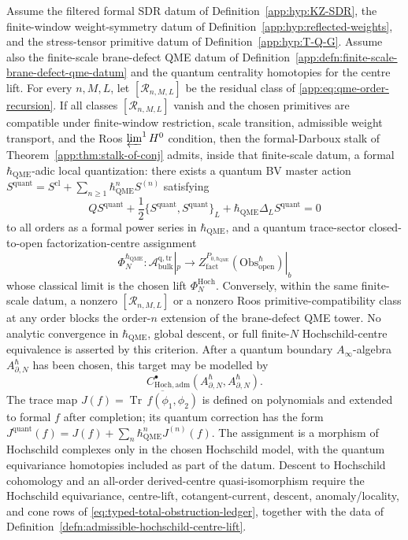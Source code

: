 \begin{thm}\label{app:thm:relative-qme}
Assume the filtered formal SDR datum of
Definition~\ref{app:hyp:KZ-SDR}, the finite-window weight-symmetry datum
of Definition~\ref{app:hyp:reflected-weights}, and the stress-tensor
primitive datum of Definition~\ref{app:hyp:T-Q-G}.  Assume also the
finite-scale brane-defect QME datum of
Definition~\ref{app:defn:finite-scale-brane-defect-qme-datum} and the
quantum centrality homotopies for the centre lift.  For every
\(n,M,L\), let
\([\mathcal R_{n,M,L}]\) be the residual class of
\eqref{app:eq:qme-order-recursion}.  If all classes
\([\mathcal R_{n,M,L}]\) vanish and the chosen primitives are compatible
under finite-window restriction, scale transition, admissible weight
transport, and the Roos \(\varprojlim^1H^0\) condition, then the
formal-Darboux stalk of Theorem~\ref{app:thm:stalk-of-conj} admits,
inside that finite-scale datum, a formal \(\hbar_{\mathrm{QME}}\)-adic
local quantization: there exists a quantum BV master action
$S^{\mathrm{quant}}=S^{\mathrm{cl}}+\sum_{n\geq 1}\hbar_{\mathrm{QME}}^n S^{(n)}$
satisfying
\[
  QS^{\mathrm{quant}}
  +
  \frac12\{S^{\mathrm{quant}},S^{\mathrm{quant}}\}_L
  +\hbar_{\mathrm{QME}}\Delta_L S^{\mathrm{quant}}=0
\]
to all orders as a formal power series in \(\hbar_{\mathrm{QME}}\), and a
quantum trace-sector closed-to-open factorization-centre assignment
\[
  \Phi_N^{\hbar_{\mathrm{QME}}}\colon
  \mathcal A^{\mathrm{q,tr}}_{\mathrm{bulk}}|_p
  \longrightarrow
  Z^{P_{0,\hbar_{\mathrm{QME}}}}_{\mathrm{fact}}
  (\mathrm{Obs}^\hbar_{\mathrm{open}})|_b
\]
whose classical limit is the chosen lift \(\Phi_N^{\mathrm{Hoch}}\).
Conversely, within the same finite-scale datum, a nonzero
\([\mathcal R_{n,M,L}]\) or a nonzero Roos primitive-compatibility class
at any order blocks the order-\(n\) extension of the brane-defect QME
tower.
No analytic convergence in \(\hbar_{\mathrm{QME}}\), global descent, or
full finite-\(N\) Hochschild-centre equivalence is asserted by this
criterion.  After a quantum boundary \(A_\infty\)-algebra
\(A^\hbar_{\partial,N}\) has been chosen, this target may be modelled by
\[
  C^\bullet_{\mathrm{Hoch},\mathrm{adm}}
  (A^\hbar_{\partial,N},A^\hbar_{\partial,N}).
\]
The trace
map \(J(f)=\overline{\operatorname{Tr}\,f(\phi_1,\phi_2)}\) is defined
on polynomials and extended to formal \(f\) after completion; its
quantum correction has the form
\(J^{\mathrm{quant}}(f)=J(f)+\sum_n\hbar_{\mathrm{QME}}^nJ^{(n)}(f)\).
The assignment is a morphism of Hochschild complexes only in the chosen
Hochschild model, with the quantum equivariance homotopies included as
part of the datum.  Descent to Hochschild cohomology and an all-order
derived-centre quasi-isomorphism require the Hochschild equivariance,
centre-lift, cotangent-current, descent, anomaly/locality, and cone rows
of \eqref{eq:typed-total-obstruction-ledger}, together with the data of
Definition~\ref{defn:admissible-hochschild-centre-lift}.
\end{thm}

